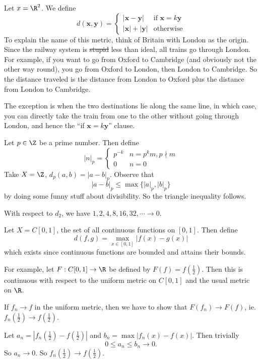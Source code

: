 \documentclass[a4paper]{article}
\begin{document}
\begin{eg}
  Let $x = \R^2$. We define
  \[
    d(\mathbf{x}, \mathbf{y}) = 
    \begin{cases}
      |\mathbf{x} - \mathbf{y}|&\text{if }\mathbf{x} = k\mathbf{y}\\
      |\mathbf{x}| + |\mathbf{y}|&\text{otherwise}
    \end{cases}
  \]
  To explain the name of this metric, think of Britain with London as the origin. Since the railway system is \st{stupid} less than ideal, all trains go through London. For example, if you want to go from Oxford to Cambridge (and obviously not the other way round), you go from Oxford to London, then London to Cambridge. So the distance traveled is the distance from London to Oxford plus the distance from London to Cambridge.

  The exception is when the two destinations lie along the same line, in which case, you can directly take the train from one to the other without going through London, and hence the ``if $\mathbf{x} = k\mathbf{y}$'' clause.
\end{eg}

\begin{eg}
  Let $p\in \Z$ be a prime number. Then define
  \[
    |n|_p = 
    \begin{cases}
      p^{-k} & n = p^k m, p\nmid m\\
      0 & n = 0
    \end{cases}
  \]
  Take $X = \Z$, $d_p (a, b) = |a - b|_p$.  Observe that
  \[
    |a - b|_p \leq \max\{|a|_p, |b|_p\}
  \]
  by doing some funny stuff about divisibility. So the triangle inequality follows.

  With respect to $d_2$, we have $1, 2, 4, 8, 16, 32, \cdots \to 0$.
\end{eg}

\begin{eg}
  Let $X = C[0, 1]$, the set of all continuous functions on $[0, 1]$. Then define
  \[
    d(f, g) = \max_{x\in [0, 1]}|f(x) - g(x)|
  \]
  which exists since continuous functions are bounded and attains their bounds.

  For example, let $F: C[0, 1] \to \R$ be defined by $F(f) = f(\frac{1}{2})$. Then this is continuous with respect to the uniform metric on $C[0, 1]$ and the usual metric on $\R$.

  If $f_n \to f$ in the uniform metric, then we have to show that $F(f_n) \to F(f)$, ie. $f_n(\frac{1}{2}) \to f(\frac{1}{2})$.

  Let $a_n = |f_n(\frac{1}{2}) - f(\frac{1}{2})|$ and $b_n = \max |f_n(x) - f(x)|$. Then trivially
  \[
    0 \leq a_n \leq b_n \to 0.
  \]
  So $a_n \to 0$. So $f_n(\frac{1}{2}) \to f(\frac{1}{2})$.
\end{eg}
\end{document}
